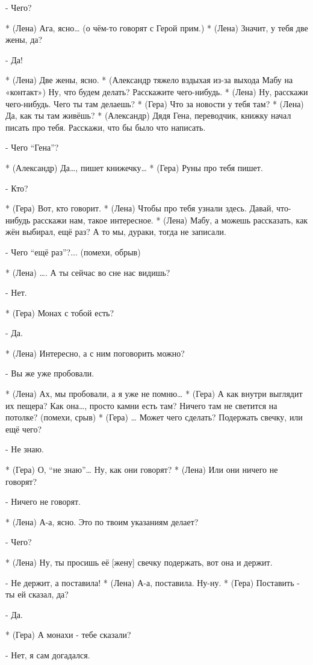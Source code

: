 - Чего?

* (Лена) Ага, ясно… (о чём-то говорят с Герой прим.)
* (Лена) Значит, у тебя две жены, да?

- Да!

* (Лена) Две жены, ясно.
* (Александр тяжело вздыхая из-за выхода Мабу на «контакт») Ну, что будем делать? Расскажите чего-нибудь. 
* (Лена) Ну, расскажи чего-нибудь. Чего ты там делаешь?
* (Гера) Что за новости у тебя там?
* (Лена) Да, как ты там живёшь?
* (Александр) Дядя Гена, переводчик, книжку начал писать про тебя. Расскажи, что бы было что написать.

- Чего “Гена”?

* (Александр) Да…, пишет книжечку…
* (Гера) Руны про тебя пишет.

- Кто?

* (Гера) Вот, кто говорит.
* (Лена) Чтобы про тебя узнали здесь. Давай, что-нибудь расскажи нам, такое интересное. 
* (Лена) Мабу, а можешь рассказать, как жён выбирал, ещё раз? А то мы, дураки, тогда не записали.

- Чего “ещё раз”?...  (помехи, обрыв) 

* (Лена) …. А ты сейчас во сне нас видишь?

- Нет.

* (Гера) Монах с тобой есть?

- Да.

* (Лена) Интересно, а с ним поговорить можно?

- Вы же уже пробовали.

* (Лена) Ах, мы пробовали, а я уже не помню…
* (Гера) А как внутри выглядит их пещера? Как она…, просто камни есть там? Ничего там не светится на потолке?  (помехи, срыв)
* (Гера) … Может чего сделать? Подержать свечку, или ещё чего?

- Не знаю.

* (Гера) О, “не знаю”… Ну, как они говорят?
* (Лена) Или они ничего не говорят?

- Ничего не говорят.

* (Лена) А-а, ясно. Это по твоим указаниям делает?

- Чего?

* (Лена) Ну, ты просишь её [жену] свечку подержать, вот она и держит.

- Не держит, а поставила!
* (Лена) А-а, поставила. Ну-ну.
* (Гера) Поставить - ты ей сказал, да?

- Да.

* (Гера) А монахи - тебе сказали?

- Нет, я сам догадался.

